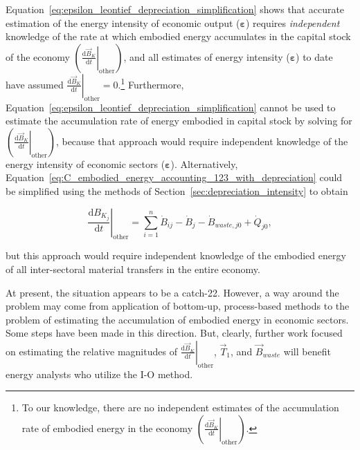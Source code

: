 Equation~\ref{eq:epsilon_leontief_depreciation_simplification} shows that 
accurate estimation of the energy intensity of economic output ($\bm{\varepsilon}$)
requires \emph{independent} knowledge of the rate 
at which embodied energy accumulates in the capital stock of the economy 
$\left( \left. \frac{\mathrm{d}\vec{B}_{K}}{\mathrm{d}t} \right|_{\mathrm{other}} \right)$,
and all estimates of energy intensity ($\bm{\varepsilon}$) to date have assumed 
$\left. \frac{\mathrm{d}\vec{B}_{K}}{\mathrm{d}t} \right|_{\mathrm{other}} = 0$.\footnote{To 
our knowledge, there are no independent estimates 
of the accumulation rate of embodied energy in the economy
$\left( \left. \frac{\mathrm{d}\vec{B}_{K}}{\mathrm{d}t} \right|_{\mathrm{other}} \right)$.}
Furthermore, Equation~\ref{eq:epsilon_leontief_depreciation_simplification} 
cannot be used to estimate the accumulation rate of energy embodied in 
capital stock by solving for 
$\left( \left. \frac{\mathrm{d}\vec{B}_{K}}{\mathrm{d}t} \right|_{\mathrm{other}} \right)$,
because that approach would require independent knowledge
of the energy intensity of economic sectors ($\bm{\varepsilon}$).
Alternatively, Equation~\ref{eq:C_embodied_energy_accounting_123_with_depreciation} 
could be simplified using the 
methods of Section~\ref{sec:depreciation_intensity} to obtain

\begin{equation} \label{eq:C_embodied_energy_accounting_123_with_depreciation_simplified}
	\left. \frac{\mathrm{d}B_{K_{j}}}{\mathrm{d}t} \right|_{\mathrm{other}}
	= \sum\limits_{i=1}^n\dot{B}_{ij} 
	- \dot{B}_{j}
	- \dot{B}_{waste,j0}
	+ \dot{Q}_{j0},
\end{equation}

\noindent{}but this approach would require independent knowledge of the 
embodied energy of all inter-sectoral material transfers in the entire economy.

At present, the situation appears to be a catch-22. 
However, a way around the problem may come from application
of bottom-up, process-based methods to the problem 
of estimating the accumulation of embodied energy 
in economic sectors. 
Some steps have been made in this direction.\cite{brandt2013calculating}
But, clearly, further work focused on estimating the relative magnitudes of 
$\left. \frac{\mathrm{d}\vec{B}_{K}}{\mathrm{d}t} \right|_{\mathrm{other}}$,
$\vec{T}_{1}$, and $\vec{B}_{waste}$ 
will benefit energy analysts who utilize the I-O method.



